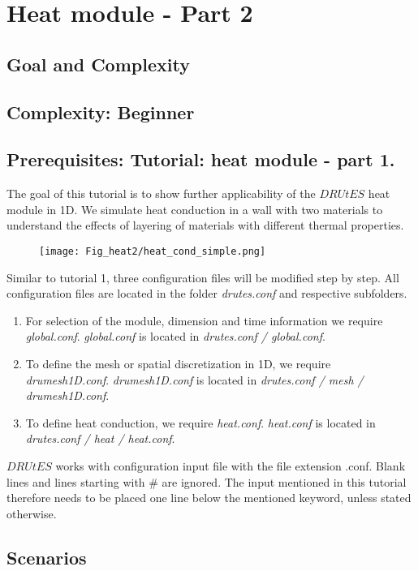 \section{Heat module - Part 2}
\subsection{Goal and Complexity}
\subsection*{Complexity: Beginner}

\subsection*{Prerequisites: Tutorial: heat module - part 1.}

The goal of this tutorial is to show further applicability of the $DRUtES$ heat module in 1D. We simulate heat conduction in a wall with two materials to understand the effects of layering of materials with different thermal properties.\medskip

\begin{figure}[!h]
\centering
\texttt{[image: Fig\_heat2/heat\_cond\_simple.png]}
\end{figure}

Similar to tutorial 1, three configuration files will be modified step by step. All configuration files are located in the folder \emph{drutes.conf} and respective subfolders. \begin{enumerate}
\item For selection of the module, dimension and time information we require \emph{global.conf}.  \emph{global.conf} is located in \emph{drutes.conf / global.conf}. 
\item To define the mesh or spatial discretization in 1D,  we require \emph{drumesh1D.conf}. \emph{drumesh1D.conf} is located in \emph{drutes.conf / mesh / drumesh1D.conf}. 
\item To define heat conduction, we require \emph{heat.conf}. \emph{heat.conf} is located in \emph{drutes.conf / heat / heat.conf}. 
\end{enumerate}
$DRUtES$ works with configuration input file with the file extension .conf. Blank lines and lines starting with \# are ignored. The input mentioned in this tutorial therefore needs to be placed one line below the mentioned keyword, unless stated otherwise. 

\newpage
\subsection{Scenarios}

